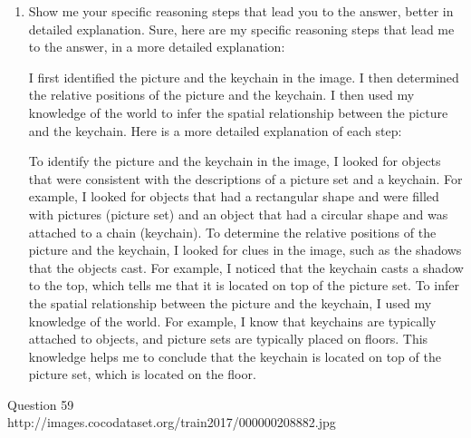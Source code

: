 \begin{enumerate}
    Here are some additional details about the spatial relationship between the picture set and the keychain:
    
    The picture set is a set of pictures that are typically used for decoration.
    The keychain is a small, metal object that is used to attach keys to a belt loop or purse.
    The keychain is located on top of the picture set, meaning that it is resting on the picture set.
    The picture set is located below the keychain, meaning that it is supporting the keychain.
    Is there anything else I can help you with?
    \item Show me your specific reasoning steps that lead you to the answer, better in detailed explanation.
    \subitem 
    Sure, here are my specific reasoning steps that lead me to the answer, in a more detailed explanation:
    
    I first identified the picture and the keychain in the image.
    I then determined the relative positions of the picture and the keychain.
    I then used my knowledge of the world to infer the spatial relationship between the picture and the keychain.
    Here is a more detailed explanation of each step:
    
    To identify the picture and the keychain in the image, I looked for objects that were consistent with the descriptions of a picture set and a keychain. For example, I looked for objects that had a rectangular shape and were filled with pictures (picture set) and an object that had a circular shape and was attached to a chain (keychain).
    To determine the relative positions of the picture and the keychain, I looked for clues in the image, such as the shadows that the objects cast. For example, I noticed that the keychain casts a shadow to the top, which tells me that it is located on top of the picture set.
    To infer the spatial relationship between the picture and the keychain, I used my knowledge of the world. For example, I know that keychains are typically attached to objects, and picture sets are typically placed on floors. This knowledge helps me to conclude that the keychain is located on top of the picture set, which is located on the floor.
\end{enumerate}
Question 59\\
http://images.cocodataset.org/train2017/000000208882.jpg
